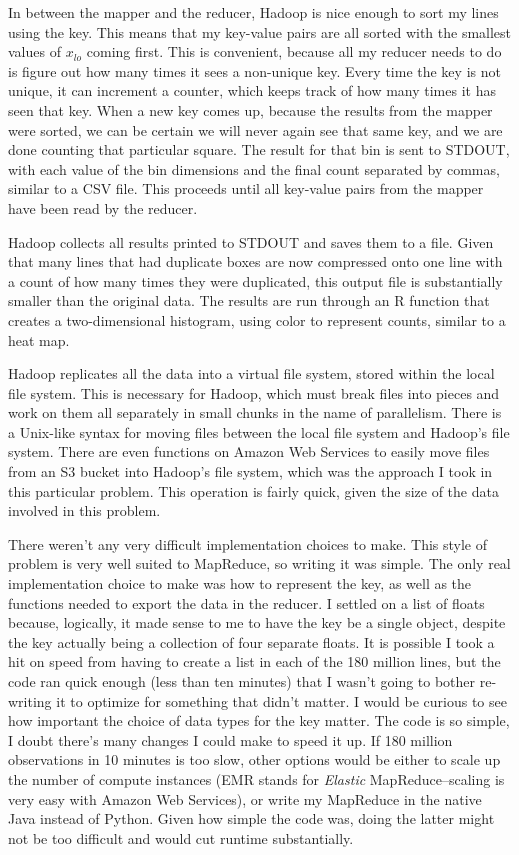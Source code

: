 \documentclass[12pt]{article}
\begin{document}
In between the mapper and the reducer, Hadoop is nice enough to sort my lines using the key. This means that my key-value pairs are all sorted with the smallest values of $x_{lo}$ coming first. This is convenient, because all my reducer needs to do is figure out how many times it sees a non-unique key. Every time the key is not unique, it can increment a counter, which keeps track of how many times it has seen that key. When a new key comes up, because the results from the mapper were sorted, we can be certain we will never again see that same key, and we are done counting that particular square. The result for that bin is sent to STDOUT, with each value of the bin dimensions and the final count separated by commas, similar to a CSV file. This proceeds until all key-value pairs from the mapper have been read by the reducer. 

Hadoop collects all results printed to STDOUT and saves them to a file. Given that many lines that had duplicate boxes are now compressed onto one line with a count of how many times they were duplicated, this output file is substantially smaller than the original data. The results are run through an R function that creates a two-dimensional histogram, using color to represent counts, similar to a heat map.

Hadoop replicates all the data into a virtual file system, stored within the local file system. This is necessary for Hadoop, which must break files into pieces and work on them all separately in small chunks in the name of parallelism. There is a Unix-like syntax for moving files between the local file system and Hadoop's file system. There are even functions on Amazon Web Services to easily move files from an S3 bucket into Hadoop's file system, which was the approach I took in this particular problem. This operation is fairly quick, given the size of the data involved in this problem.

There weren't any very difficult implementation choices to make. This style of problem is very well suited to MapReduce, so writing it was simple. The only real implementation choice to make was how to represent the key, as well as the functions needed to export the data in the reducer. I settled on a list of floats because, logically, it made sense to me to have the key be a single object, despite the key actually being a collection of four separate floats. It is possible I took a hit on speed from having to create a list in each of the 180 million lines, but the code ran quick enough (less than ten minutes) that I wasn't going to bother re-writing it to optimize for something that didn't matter. I would be curious to see how important the choice of data types for the key matter. The code is so simple, I doubt there's many changes I could make to speed it up. If 180 million observations in 10 minutes is too slow, other options would be either to scale up the number of compute instances (EMR stands for \emph{Elastic} MapReduce--scaling is very easy with Amazon Web Services), or write my MapReduce in the native Java instead of Python. Given how simple the code was, doing the latter might not be too difficult and would cut runtime substantially. 
\end{document}
